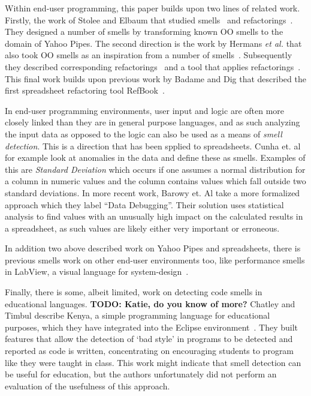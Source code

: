 \documentclass{sig-alternate}
\newcommand{\todo}[1]{\textbf{TODO: #1}}
\begin{document}
Within end-user programming, this paper builds upon two lines of related work. Firstly, the work of Stolee and Elbaum that studied smells~\cite{StoleeTSE2013} and refactorings~\cite{Stolee2011}. They designed a number of smells by transforming known OO smells to the domain of Yahoo Pipes. The second direction is the work by Hermans \emph{et al.} that also took OO smells as an inspiration from a number of smells~\cite{Hermans2012intra, Hermans2012inter}. Subsequently they described corresponding refactorings~\cite{Hermans2012intraExt} and a tool that applies refactorings~\cite{hermans2014bumblebee}. This final work builds upon previous work by Badame and Dig that described the first spreadsheet refactoring tool RefBook~\cite{badame2012refactoring}.

In end-user programming environments, user input and logic are often more closely linked than they are in general purpose languages, and as such analyzing the input data as opposed to the logic can also be used as a means of \emph{smell detection}. This is a direction that has been spplied to spreadsheets. Cunha et. al \cite{cunha2012towards} for example look at anomalies in the data and define these as smells. Examples of this are \textit{Standard Deviation} which occurs if one assumes a normal distribution for a column in numeric values and the column contains values which fall outside two standard deviations. In more recent work, Barowy et. Al \cite{barowy2014checkcell} take a more formalized approach which they label ``Data Debugging''. Their solution uses statistical analysis to find values with an unusually high impact on the calculated results in a spreadsheet, as such values are likely either very important or erroneous.

In addition two above described work on Yahoo Pipes and spreadsheets, there is previous smells work on other end-user environments too, like performance smells in LabView, a visual language for system-design~\cite{chambers2013smell, chambers2015impact}. 

Finally, there is some, albeit limited, work on detecting code smells in educational languages. \todo{Katie, do you know of more?} Chatley and Timbul describe Kenya, a simple programming language for educational purposes, which they have integrated into the Eclipse environment~\cite{Chatley2005}. They built features that allow the detection of `bad style' in programs to be detected and reported as code is written, concentrating on encouraging students to program like they were taught in class. This work might indicate that smell detection can be useful for education, but the authors unfortunately did not perform an evaluation of the usefulness of this approach.
\end{document}
